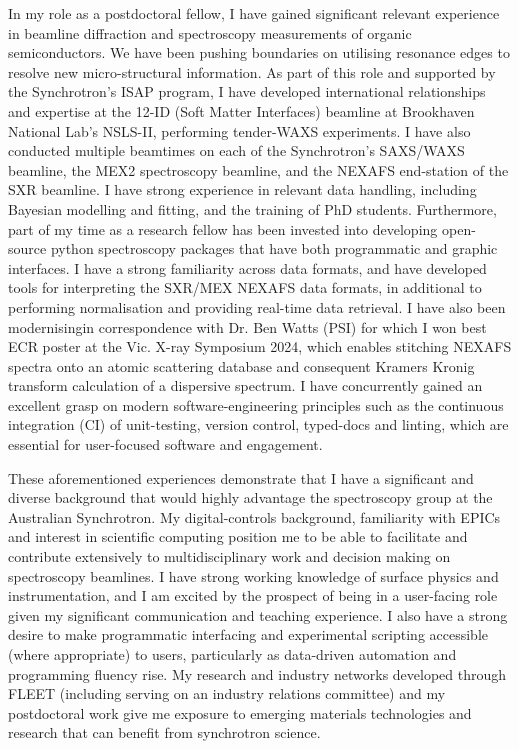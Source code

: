\documentclass[10pt,a4paper,ragged2e,withhyper,paragraphstrue]{altacv}
\newcommand{\pind}{\hspace{24pt}}
\begin{document}
{	\pind In my role as a postdoctoral fellow, I have gained significant relevant experience in beamline diffraction and spectroscopy measurements of organic semiconductors. We have been pushing boundaries on utilising resonance edges to resolve new  micro-structural information. 
	As part of this role and supported by the Synchrotron's ISAP program, I have developed international relationships and expertise at the 12-ID (Soft Matter Interfaces) beamline at Brookhaven National Lab's NSLS-II, performing tender-WAXS experiments. I have also conducted multiple beamtimes on each of the Synchrotron's SAXS/WAXS beamline, the MEX2 spectroscopy beamline, and the NEXAFS end-station of the SXR beamline. I have strong experience in relevant data handling, including Bayesian modelling and fitting, and the training of PhD students.
	Furthermore, part of my time as a research fellow has been invested into developing open-source python spectroscopy packages that have both programmatic and graphic interfaces. I have a strong familiarity across data formats, and have developed tools for interpreting the SXR/MEX NEXAFS data formats, in additional to performing normalisation and providing real-time data retrieval. I have also been modernisingin correspondence with Dr. Ben Watts (PSI) for which I won best ECR poster at the Vic. X-ray Symposium 2024, which enables stitching NEXAFS spectra onto an atomic scattering database and consequent Kramers Kronig transform calculation of a dispersive spectrum. I have concurrently gained an excellent grasp on modern software-engineering principles such as the continuous integration (CI) of unit-testing, version control, typed-docs and linting, which are  essential for user-focused software and engagement.
		
	\pind These aforementioned experiences demonstrate that I have a significant and diverse background that would highly advantage the spectroscopy group at the Australian Synchrotron. My digital-controls background, familiarity with EPICs and interest in scientific computing position me to be able to facilitate and contribute extensively to multidisciplinary work and decision making on spectroscopy beamlines. I have strong working knowledge of surface physics and instrumentation, and I am excited by the prospect of being in a user-facing role given my significant communication and teaching experience. I also have a strong desire to make programmatic interfacing and experimental scripting accessible (where appropriate) to users, particularly as data-driven automation and programming fluency rise. My research and industry networks developed through FLEET (including serving on an industry relations committee) and my postdoctoral work give me exposure to emerging materials technologies and research that can benefit from synchrotron science.
	
}
\end{document}

